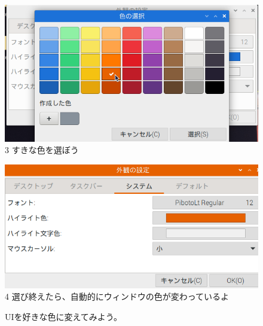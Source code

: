 \documentclass[a4paper,12pt]{jarticle}
\begin{document}
\begin{figure}
\begin{minipage}{\textwidth}
    \begin{minipage}{0.45\linewidth}
      \includegraphics[width=\linewidth]{textbook-img1002.png}\\
      3 すきな色を選ぼう
    \end{minipage}
    \begin{minipage}{2.582cm}
    \end{minipage}
    \begin{minipage}{0.45\linewidth}
      \includegraphics[width=\linewidth]{textbook-img1003.png}\\
      4 選び終えたら、自動的にウィンドウの色が変わっているよ
    \end{minipage}

    \bigskip

    \theQuestion

    UIを好きな色に変えてみよう。
  \end{minipage}


\end{figure}


\bigskip

\clearpage
\end{document}
